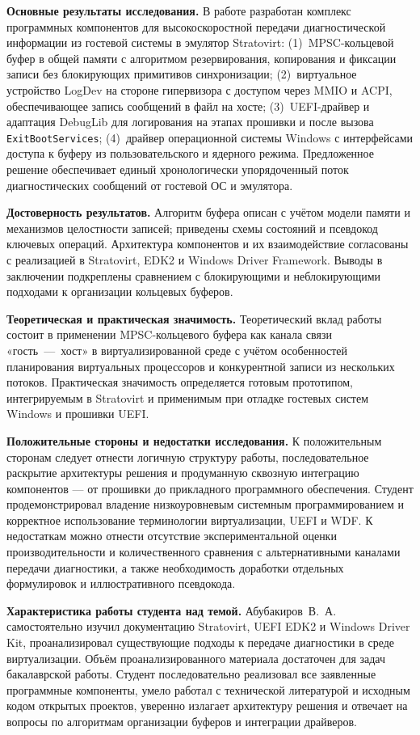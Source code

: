 \documentclass[a4paper, 14pt]{article}
\begin{document}
\textbf{Основные результаты исследования.}
В работе разработан комплекс программных компонентов для высокоскоростной
передачи диагностической информации из гостевой системы в эмулятор Stratovirt:
(1)~MPSC-кольцевой буфер в общей памяти с алгоритмом резервирования,
копирования и фиксации записи без блокирующих примитивов синхронизации;
(2)~виртуальное устройство LogDev на стороне гипервизора с доступом через MMIO
и ACPI, обеспечивающее запись сообщений в файл на хосте;
(3)~UEFI-драйвер и адаптация DebugLib для логирования на этапах прошивки и после
вызова \texttt{ExitBootServices};
(4)~драйвер операционной системы Windows с интерфейсами доступа к буферу из
пользовательского и ядерного режима.
Предложенное решение обеспечивает единый хронологически упорядоченный поток
диагностических сообщений от гостевой ОС и эмулятора.

\textbf{Достоверность результатов.}
Алгоритм буфера описан с учётом модели памяти и механизмов целостности записей;
приведены схемы состояний и псевдокод ключевых операций. Архитектура компонентов
и их взаимодействие согласованы с реализацией в Stratovirt, EDK2 и Windows Driver
Framework. Выводы в заключении подкреплены сравнением с блокирующими и
неблокирующими подходами к организации кольцевых буферов.

\textbf{Теоретическая и практическая значимость.}
Теоретический вклад работы состоит в применении MPSC-кольцевого буфера
как канала связи «гость~---~хост» в виртуализированной среде с учётом особенностей
планирования виртуальных процессоров и конкурентной записи из нескольких потоков.
Практическая значимость определяется готовым прототипом, интегрируемым в Stratovirt
и применимым при отладке гостевых систем Windows и прошивки UEFI.

\textbf{Положительные стороны и недостатки исследования.}
К положительным сторонам следует отнести логичную структуру работы, последовательное
раскрытие архитектуры решения и продуманную сквозную интеграцию компонентов --- от
прошивки до прикладного программного обеспечения. Студент продемонстрировал владение
низкоуровневым системным программированием и корректное использование терминологии
виртуализации, UEFI и WDF. К недостаткам можно отнести отсутствие экспериментальной
оценки производительности и количественного сравнения с альтернативными каналами
передачи диагностики, а также необходимость доработки отдельных формулировок и
иллюстративного псевдокода.

\textbf{Характеристика работы студента над темой.}
Абубакиров~В.~А. самостоятельно изучил документацию Stratovirt, UEFI EDK2 и Windows
Driver Kit, проанализировал существующие подходы к передаче диагностики в среде
виртуализации. Объём проанализированного материала достаточен для задач бакалаврской
работы. Студент последовательно реализовал все заявленные программные компоненты,
умело работал с технической литературой и исходным кодом открытых проектов, уверенно
излагает архитектуру решения и отвечает на вопросы по алгоритмам организации буферов и
интеграции драйверов.
\end{document}
